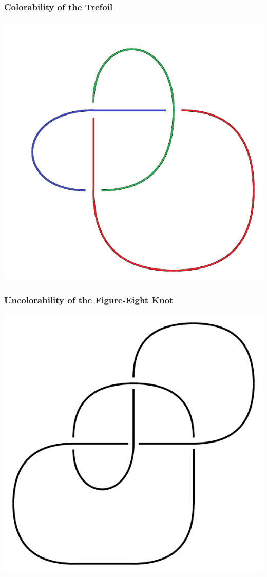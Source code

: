 \documentclass{beamer}
\begin{document}
\begin{frame}
  \frametitle{Colorability of the Trefoil}
  \begin{center}
    \includegraphics[scale=.4]{trefoil-c}
  \end{center}
\end{frame}

\begin{frame}
  \frametitle{Uncolorability of the Figure-Eight Knot}
  \begin{center}
    \includegraphics[scale=.4]{figure-eight}
  \end{center}
\end{frame}
\end{document}
